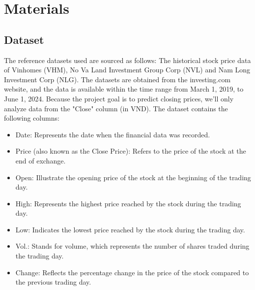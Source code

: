 \documentclass{ieeeojies}
\begin{document}
	\section{Materials}
	\subsection{Dataset}
	The reference datasets used are sourced as follows: The historical stock price data of Vinhomes (VHM), No Va Land Investment Group Corp (NVL) and Nam Long Investment Corp (NLG). The datasets are obtained from the investing.com website, and the data is available within the time range from March 1, 2019, to June 1, 2024. Because the project goal is to predict closing prices, we'll only analyze data from the "Close" column (in VND). The dataset contains the following columns:
	\begin{itemize}
		\item Date: Represents the date when the financial data was recorded.
		\item Price (also known as the Close Price): Refers to the price of the stock at the end of
		exchange.
		\item Open: Illustrate the opening price of the stock at the beginning of the trading day.
		\item High: Represents the highest price reached by the stock during the trading day.
		\item Low: Indicates the lowest price reached by the stock during the trading day.
		\item Vol.: Stands for volume, which represents the number of shares traded during the
		trading day.
		\item Change: Reflects the percentage change in the price of the stock compared to the
		previous trading day.
	\end{itemize}
\end{document}
